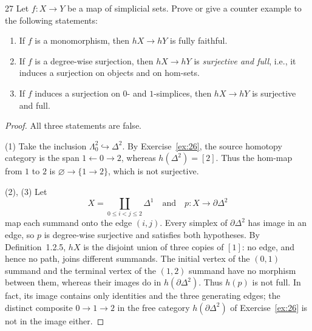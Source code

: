 \begin{exercise}{27}
Let $f\colon X\to Y$ be a map of simplicial sets. Prove or give a counter example to
the following statements:
\begin{enumerate}[label=(\arabic*),leftmargin=*,itemsep=0pt,parsep=0pt,
                  topsep=.5\baselineskip]
 \item If $f$ is a monomorphism, then $hX\to hY$ is fully faithful.
 \item If $f$ is a degree-wise surjection, then $hX\to hY$ is
       \emph{surjective and full}, i.e., it induces a surjection on objects and on hom-sets.
 \item If $f$ induces a surjection on $0$- and $1$-simplices, then
       $hX\to hY$ is surjective and full.
\end{enumerate}

\begin{proof}
All three statements are false.

(1) Take the inclusion $\Lambda_0^2\hookrightarrow\Delta^2$.
By Exercise~\ref{ex:26}, the source homotopy category is the span
$1\leftarrow0\to2$, whereas $h(\Delta^2)=[2]$.
Thus the hom-map from $1$ to $2$ is $\varnothing\to\{1\to2\}$,
which is not surjective.

(2), (3) Let
\[
 X=\coprod_{0\le i<j\le2}\Delta^1
 \quad\text{and}\quad
 p\colon X\longrightarrow\partial\Delta^2
\]
map each summand onto the edge $(i,j)$.
Every simplex of $\partial\Delta^2$ has image in an edge, so
$p$ is degree-wise surjective and satisfies both hypotheses.
By Definition~1.2.5, $hX$ is the disjoint union of three copies
of $[1]$: no edge, and hence no path, joins different summands.
The initial vertex of the $(0,1)$ summand and the terminal
vertex of the $(1,2)$ summand have no morphism between them, whereas
their images do in $h(\partial\Delta^2)$. Thus $h(p)$ is not full.
In fact, its image contains only identities and the three
generating edges; the distinct composite $0\to1\to2$ in the
free category $h(\partial\Delta^2)$ of Exercise~\ref{ex:26}
is not in the image either.
\end{proof}
\end{exercise}
